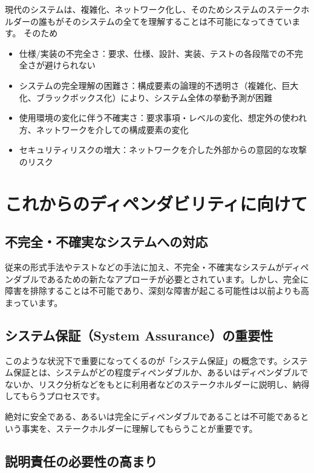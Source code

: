 現代のシステムは、複雑化、ネットワーク化し、そのためシステムのステークホルダーの誰もがそのシステムの全てを理解することは不可能になってきています。
そのため
\begin{itemize}
\item 仕様/実装の不完全さ：要求、仕様、設計、実装、テストの各段階での不完全さが避けられない
\item システムの完全理解の困難さ：構成要素の論理的不透明さ（複雑化、巨大化、ブラックボックス化）により、システム全体の挙動予測が困難
\item 使用環境の変化に伴う不確実さ：要求事項・レベルの変化、想定外の使われ方、ネットワークを介しての構成要素の変化
\item セキュリティリスクの増大：ネットワークを介した外部からの意図的な攻撃のリスク
\end{itemize}

\section{これからのディペンダビリティに向けて}

\subsection{不完全・不確実なシステムへの対応}

従来の形式手法やテストなどの手法に加え、不完全・不確実なシステムがディペンダブルであるための新たなアプローチが必要とされています。しかし、完全に障害を排除することは不可能であり、深刻な障害が起こる可能性は以前よりも高まっています。

\subsection{システム保証（System Assurance）の重要性}

このような状況下で重要になってくるのが「システム保証」の概念です。システム保証とは、システムがどの程度ディペンダブルか、あるいはディペンダブルでないか、リスク分析などをもとに利用者などのステークホルダーに説明し、納得してもらうプロセスです。

絶対に安全である、あるいは完全にディペンダブルであることは不可能であるという事実を、ステークホルダーに理解してもらうことが重要です。

\subsection{説明責任の必要性の高まり}

